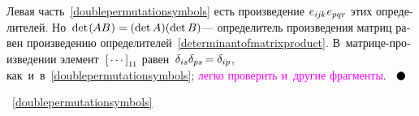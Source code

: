 \begin{otherlanguage}{russian}
\vspace{-0.1em}\noindent
Левая часть~\eqref{doublepermutationsymbols}
есть произведение
${e_{i\hspace{-0.1ex}j\hspace{-0.1ex}k} \hspace{.1ex} e_{pqr}}$
этих определителей.
Но~${\operatorname{det} \hspace{.2ex} (\hspace{-0.1ex}AB\hspace{.1ex}) = (\operatorname{det} A)(\operatorname{det} B)}$\:---
определитель произведения матриц равен произведению определителей~\eqref{determinantofmatrixproduct}.
В~матрице\hbox{-}произведении
элемент~${\left[{\,\cdots\,}\right]}_{1\hspace{-0.1ex}1}$
равен~${\delta_{is} \delta_{ps} \hspace{-0.2ex} = \delta_{ip}}$,
как~и~в~\eqref{doublepermutationsymbols};
\textcolor{magenta}{легко проверить и~другие фрагменты}.
${ \hspace{.6em}
\tikz[baseline=-0.6ex] \draw [color=black, fill=black] (0, 0) circle (.8ex); }$

\end{otherlanguage}

~\eqref{doublepermutationsymbols}
~%

